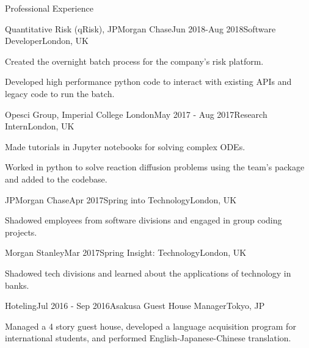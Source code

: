 \documentclass[10pt]{resume} %
\begin{document}
\begin{rSection}{Professional Experience}


\begin{rSubsection}{Quantitative Risk (qRisk), JPMorgan Chase}{Jun 2018-Aug 2018}{Software
Developer}{London, UK}
  \item Created the overnight batch process for the company's risk platform.
  \item Developed high performance python code to interact with existing APIs
and legacy code to run the batch.
\end{rSubsection}


\begin{rSubsection}{Opesci Group, Imperial College London}{May 2017 - Aug 2017}{Research Intern}{London, UK}
    \item Made tutorials in Jupyter notebooks for solving complex ODEs.
    \item Worked in python to solve reaction diffusion problems using the
    team's package and added to the codebase.
\end{rSubsection}


\begin{rSubsection}{JPMorgan Chase}{Apr 2017}{Spring into Technology}{London, UK}
    \item Shadowed employees from software divisions and engaged in group
    coding projects.
\end{rSubsection}


\begin{rSubsection}{Morgan Stanley}{Mar 2017}{Spring Insight: Technology}{London, UK}
    \item Shadowed tech divisions and learned about the applications of
    technology in banks.
\end{rSubsection}


\begin{rSubsection}{Hoteling}{Jul 2016 - Sep 2016}{Asakusa Guest House Manager}{Tokyo, JP}
    \item Managed a 4 story guest house, developed a language acquisition
    program for international students, and performed English-Japanese-Chinese
    translation.
\end{rSubsection}


\end{rSection}
\end{document}
